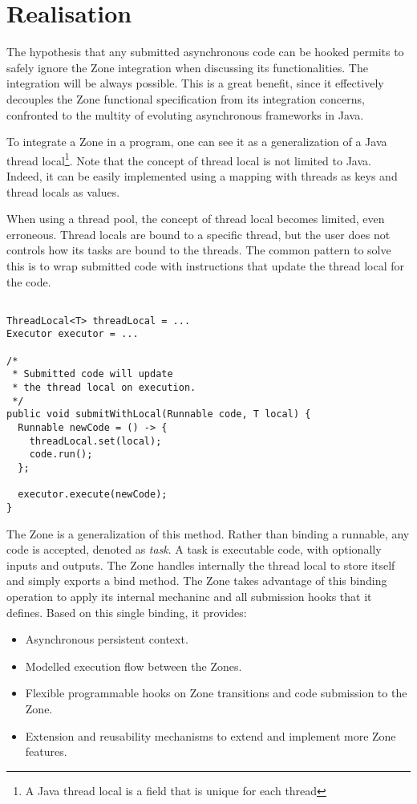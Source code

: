 \section{Realisation}

The hypothesis that any submitted asynchronous code can be hooked permits to safely ignore the Zone integration when discussing its functionalities. The integration will be always possible. This is a great benefit, since it effectively decouples the Zone functional specification from its integration concerns, confronted to the multity of evoluting asynchronous frameworks in Java.

To integrate a Zone in a program, one can see it as a generalization of a Java thread local\footnote{A Java thread local is a field that is unique for each thread}. Note that the concept of thread local is not limited to Java. Indeed, it can be easily implemented using a mapping with threads as keys and thread locals as values.

When using a thread pool, the concept of thread local becomes limited, even erroneous. Thread locals are bound to a specific thread, but the user does not controls how its tasks are bound to the threads. The common pattern to solve this is to wrap submitted code with instructions that update the thread local for the code.
\begin{lstlisting}

ThreadLocal<T> threadLocal = ...
Executor executor = ...

/*
 * Submitted code will update
 * the thread local on execution.
 */
public void submitWithLocal(Runnable code, T local) {
  Runnable newCode = () -> {
    threadLocal.set(local);
    code.run();
  };

  executor.execute(newCode);
}
\end{lstlisting}

The Zone is a generalization of this method. Rather than binding a runnable, any code is accepted, denoted as \emph{task}. A task is executable code, with optionally inputs and outputs. The Zone handles internally the thread local to store itself and simply exports a bind method.
The Zone takes advantage of this binding operation to apply its internal mechaninc and all submission hooks that it defines. Based on this single binding, it provides:
\begin{itemize}
\item Asynchronous persistent context.
\item Modelled execution flow between the Zones.
\item Flexible programmable hooks on Zone transitions and code submission to the Zone.
\item Extension and reusability mechanisms to extend and implement more Zone features.
\end{itemize}


